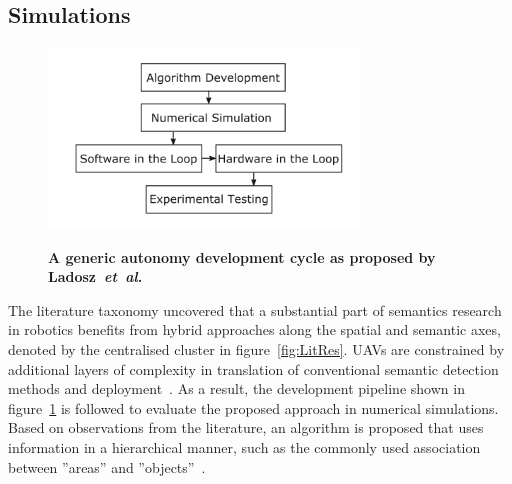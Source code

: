 \documentclass[twocolumn,letterpaper]{IEEEAerospaceCLS}  %
\newcommand{\abbreviation}[1]{\emph{#1}.}
\newcommand{\etal}{\abbreviation{et~al}}
\begin{document}
\subsection{Simulations} \label{ssec:MetSim}
\begin{figure}[h!]
    \centering
    \includegraphics[width=3.25in]{2-3DevelopmentCycle.png}\\
    \caption{\bf{A generic autonomy development cycle as proposed by Ladosz~\etal~\protect\cite{ladosz_generic_2019}}}
    \label{fig:DevProcess}
\end{figure}

The literature taxonomy uncovered that a substantial part of semantics research in robotics benefits from hybrid approaches along the spatial and semantic axes, denoted by the centralised cluster in figure~\ref{fig:LitRes}. UAVs are constrained by additional layers of complexity in translation of conventional semantic detection methods and deployment~\cite{mandel_method_2020}. As a result, the development pipeline shown in figure~\ref{fig:DevProcess} is followed to evaluate the proposed approach in numerical simulations. Based on observations from the literature, an algorithm is proposed that uses information in a hierarchical manner, such as the commonly used association between ''areas'' and ''objects''~\cite{tenorth_knowrob-map_2010,galindo_robot_2008,chaplot_object_2020,wu_learning_2018}.
\end{document}
